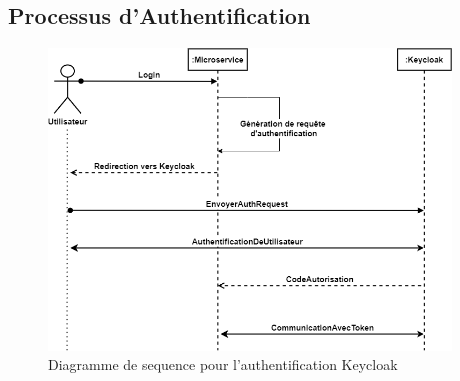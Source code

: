 
\subsection{Processus d'Authentification}

\begin{figure}[H]
\centering
\includegraphics[height=8cm , width=\textwidth]{assets/images/keycloak-seq.png}
\caption{Diagramme de sequence pour l'authentification Keycloak}
\label{fig:seq-auth}
\end{figure}
